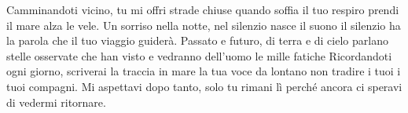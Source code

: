 \beginverse
Camminandoti vicino, tu mi offri strade chiuse
quando soffia il tuo respiro
prendi il mare alza le vele.
Un sorriso nella notte, nel silenzio nasce il suono
il silenzio ha la parola
che il tuo viaggio guiderà.
\endverse
\beginchorus
Passato e futuro, di terra e di cielo
parlano stelle osservate
che han visto e vedranno dell'uomo
le mille fatiche
\endchorus
\beginverse
Ricordandoti ogni giorno, scriverai la traccia in mare
la tua voce da lontano
non tradire i tuoi i tuoi compagni.
Mi aspettavi dopo tanto, solo tu rimani lì
perché ancora ci speravi
di vedermi ritornare.
\endverse
\endsong
